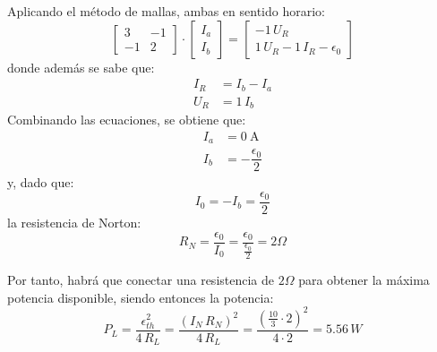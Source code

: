 Aplicando el método de mallas, ambas en sentido horario:
\begin{equation*}
  \begin{bmatrix}
    3 & -1\\
    -1 & 2
  \end{bmatrix}
  \cdot 
  \begin{bmatrix}
    I_a\\
    I_b
  \end{bmatrix}
  = 
  \begin{bmatrix}
    -1\,U_R\\
    1\,U_R-1\,I_R-\epsilon_0
  \end{bmatrix}
\end{equation*}
donde además se sabe que:
\begin{align*}
  I_R&=I_b-I_a\\
  U_R&=1\, I_b
\end{align*}
Combinando las ecuaciones, se obtiene que:
\begin{align*}
  I_a&=\qty{0}{\ampere}\\
  I_b&=-\dfrac{\epsilon_0}{2}
\end{align*}
y, dado que:
\begin{equation*}
  I_0=-I_b=\dfrac{\epsilon_0}{2}
\end{equation*}
la resistencia de Norton:
\begin{equation*}
  R_{N} = \dfrac{\epsilon_0}{I_0}=\dfrac{\epsilon_0}{\frac{\epsilon_0}{2}} = {2}{\Omega}
\end{equation*}

Por tanto, habrá que conectar una resistencia de ${2}{\Omega}$ para
obtener la máxima potencia disponible, siendo entonces la potencia:
\begin{equation*}
  P_L=\dfrac{\epsilon_{th}^2}{4\,R_L}=\dfrac{(I_N\,R_N)^2}{4\,R_L}=\dfrac{(\frac{10}{3}\cdot 2)^2}{4\cdot 2}=5.56\,W
\end{equation*}





